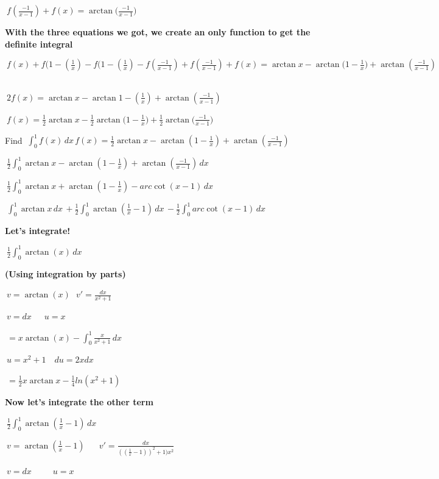 \documentclass{article}
\begin{document}
\bigskip $\ f(\frac{-1}{x-1})+f(x)=\arctan({\frac{-1}{x-1})}$

\newpage

\bigskip \textbf {With the three equations we got, we create an only function to get the definite integral}

\bigskip $\ f(x)+f(1-(\frac{1}{x})-f(1-(\frac{1}{x})-f(\frac{-1}{x-1})+f(\frac{-1}{x-1})+f(x)=\arctan{x}-\arctan({1-\frac{1}{x})+\arctan{(\frac{-1}{x-1})}}$\

\bigskip $\ 2f(x)=\arctan{x}-\arctan{1-(\frac{1}{x})+\arctan{(\frac{-1}{x-1})}}$

\bigskip $\ f(x)=\frac{1}{2}\arctan{x}-\frac{1}{2}\arctan({1-\frac{1}{x})}+\frac{1}{2}\arctan({\frac{-1}{x-1})} $\

\bigskip Find $\ \int_{0}^{1} f(x)\,dx \, f(x)=\frac{1}{2}\arctan{x}-\arctan{(1-\frac{1}{x})+\arctan{(\frac{-1}{x-1})}} $\

\bigskip $\ \frac{1}{2} \int_{0}^{1} \arctan{x}-\arctan{(1-\frac{1}{x})+\arctan{(\frac{-1}{x-1})}}\,dx \, \ $\

\bigskip  $\ \frac{1}{2} \int_{0}^{1} \arctan{x}+\arctan{(1-\frac{1}{x})-arc\cot{(x-1)}}\,dx \, $

\bigskip $\ \int_{0}^{1} \arctan{x}\,dx \,+\frac{1}{2}\int_{0}^{1} \arctan{(\frac{1}{x}-1)}\,dx \,- \frac{1}{2}\int_{0}^{1} arc\cot{(x-1)}\,dx \, $

\bigskip \textbf{Let's integrate!}

\bigskip $\ \frac{1}{2} \int_{0}^{1} \arctan{(x)} \,dx \, $

\bigskip \textbf{(Using integration by parts)}

\bigskip $\ v= \arctan{(x)} \,\,\,\, v'=\frac{dx}{x^2+1} $\

\bigskip $\ v=dx \,\,\,\,\,\,\,\,\, u=x $\

\bigskip $\ =x\arctan{(x)}-\int_{0}^{1} \frac{x}{x^2+1}\,dx \,$

\bigskip $\ u= x^2+1 \,\,\,\,\,\, du= 2x dx $\ 

\bigskip  $\ =\frac{1}{2}x\arctan{x}-\frac{1}{4}ln(x^2+1) $\

\bigskip
\bigskip \textbf{Now let's integrate the other term} 

\bigskip $\ \frac{1}{2} \int_{0}^{1} \arctan{(\frac{1}{x}-1)} \,dx \, $\

\bigskip $\ v= \arctan{(\frac{1}{x}-1)}  \,\,\,\,\,\,\,\,\,\, v'=\frac{dx}{((\frac{1}{x}-1))^2+1)x^2} $\

\bigskip $\ v=dx \,\,\,\,\,\,\,\,\,\,\,\,\,\,\,u=x $\
\end{document}
